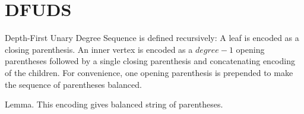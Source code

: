 \section{DFUDS}

Depth-First Unary Degree Sequence is defined recursively:
A leaf is encoded as a closing parenthesis.
An inner vertex is encoded as a $degree-1$ opening parentheses followed by a single closing parenthesis and concatenating encoding of the children.
For convenience, one opening parenthesis is prepended to make the sequence of parentheses balanced.

Lemma.
This encoding gives balanced string of parentheses.
